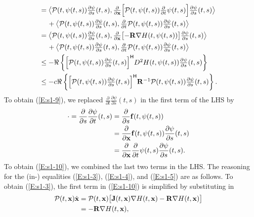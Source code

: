 \begin{align}
    &= \textstyle \big\langle \mathcal P(t, \psi(t, s)) \frac{\partial\psi}{\partial s}(t, s), \frac{\partial}{\partial \mathbf{x}} \Big[\mathcal P(t, \psi(t, s)) \frac{\partial}{\partial t} \psi(t, s) \Big] \frac{\partial\psi}{\partial s}(t, s) \big\rangle \notag \\
    &\quad\, \textstyle + \big\langle \mathcal P(t, \psi(t, s)) \frac{\partial\psi}{\partial s}(t, s), \frac{\partial}{\partial t} \mathcal P(t, \psi(t, s)) \frac{\partial\psi}{\partial s}(t, s) \big\rangle \label{E:s1-10} \\
    &= \textstyle \big\langle \mathcal P(t, \psi(t, s)) \frac{\partial\psi}{\partial s}(t, s), \frac{\partial}{\partial \mathbf{x}} \big[{-} \mathbf{R} \nabla H(t, \psi(t, s))\big] \frac{\partial\psi}{\partial s}(t, s) \big\rangle \notag \\
    &\quad\, \textstyle + \big\langle \mathcal P(t, \psi(t, s)) \frac{\partial\psi}{\partial s}(t, s), \frac{\partial}{\partial t} \mathcal P(t, \psi(t, s)) \frac{\partial\psi}{\partial s}(t, s) \big\rangle \label{E:s1-3} \\
    &\leq \textstyle - \Re\left\{ \Big[\mathcal P(t, \psi(t, s)) \frac{\partial\psi}{\partial s}(t, s)\Big]^{\mathsf{H}} D^2 H(t, \psi(t, s)) \frac{\partial\psi}{\partial s}(t, s) \right\} \label{E:s1-4} \\
    &\leq \textstyle -c \Re\left\{ \Big[\mathcal P(t, \psi(t, s)) \frac{\partial\psi}{\partial s}(t, s)\Big]^{\mathsf{H}} \mathbf{R}^{-1} \mathcal P(t, \psi(t, s)) \frac{\partial\psi}{\partial s}(t, s) \right\}. \label{E:s1-5} 
\end{align}
To obtain (\ref{E:s1-9}), we replaced $\frac{\partial}{\partial t} \frac{\partial \psi}{\partial s}(t, s)$ in the first term of the LHS by 
\begin{align*}
     \cdot = \frac{\partial}{\partial s} \frac{\partial \psi}{\partial t}(t, s) &= \frac{\partial}{\partial s} \mathbf{f}(t, \psi(t, s)) \\
     &= \frac{\partial}{\partial \mathbf{x}} \mathbf{f}(t, \psi(t, s)) \frac{\partial \psi}{\partial s}(t, s) \\
     &= \frac{\partial}{\partial \mathbf{x}} \frac{\partial}{\partial t} \psi(t, s) \frac{\partial \psi}{\partial s}(t, s).
\end{align*}
To obtain (\ref{E:s1-10}), we combined the last two terms in the LHS.
The reasoning for the (in-) equalities (\ref{E:s1-3}), (\ref{E:s1-4}), and (\ref{E:s1-5}) are as follows.
To obtain (\ref{E:s1-3}), the first term in (\ref{E:s1-10}) is simplified by substituting in
\begin{align*}
    \mathcal P(t, \mathbf{x}) \dot{\mathbf{x}} &= \mathcal P(t, \mathbf{x}) \big[\mathbf{J}(t, \mathbf{x}) \nabla H(t, \mathbf{x}) - \mathbf{R} \nabla H(t, \mathbf{x}) \big] \\
    &= -\mathbf{R} \nabla H(t, \mathbf{x}),
\end{align*}
